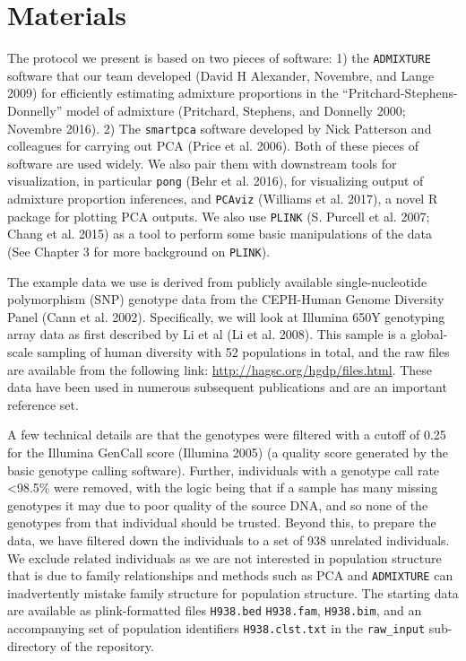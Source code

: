 \documentclass[smallextended]{svjour3}       %
\begin{document}
\section{Materials}\label{materials}

The protocol we present is based on two pieces of software: 1) the
\texttt{ADMIXTURE} software that our team developed (David H Alexander,
Novembre, and Lange 2009) for efficiently estimating admixture
proportions in the ``Pritchard-Stephens-Donnelly'' model of admixture
(Pritchard, Stephens, and Donnelly 2000; Novembre 2016). 2) The
\texttt{smartpca} software developed by Nick Patterson and colleagues
for carrying out PCA (Price et al. 2006). Both of these pieces of
software are used widely. We also pair them with downstream tools for
visualization, in particular \texttt{pong} (Behr et al. 2016), for
visualizing output of admixture proportion inferences, and
\texttt{PCAviz} (Williams et al. 2017), a novel R package for plotting
PCA outputs. We also use \texttt{PLINK} (S. Purcell et al. 2007; Chang
et al. 2015) as a tool to perform some basic manipulations of the data
(See Chapter 3 for more background on \texttt{PLINK}).

The example data we use is derived from publicly available
single-nucleotide polymorphism (SNP) genotype data from the CEPH-Human
Genome Diversity Panel (Cann et al. 2002). Specifically, we will look at
Illumina 650Y genotyping array data as first described by Li et al (Li
et al. 2008). This sample is a global-scale sampling of human diversity
with 52 populations in total, and the raw files are available from the
following link: \url{http://hagsc.org/hgdp/files.html}. These data have
been used in numerous subsequent publications and are an important
reference set.

A few technical details are that the genotypes were filtered with a
cutoff of 0.25 for the Illumina GenCall score (Illumina 2005) (a quality
score generated by the basic genotype calling software). Further,
individuals with a genotype call rate \textless{}98.5\% were removed,
with the logic being that if a sample has many missing genotypes it may
due to poor quality of the source DNA, and so none of the genotypes from
that individual should be trusted. Beyond this, to prepare the data, we
have filtered down the individuals to a set of 938 unrelated
individuals. We exclude related individuals as we are not interested in
population structure that is due to family relationships and methods
such as PCA and \texttt{ADMIXTURE} can inadvertently mistake family
structure for population structure. The starting data are available as
plink-formatted files \texttt{H938.bed} \texttt{H938.fam},
\texttt{H938.bim}, and an accompanying set of population identifiers
\texttt{H938.clst.txt} in the \texttt{raw\_input} sub-directory of the
repository.
\end{document}
